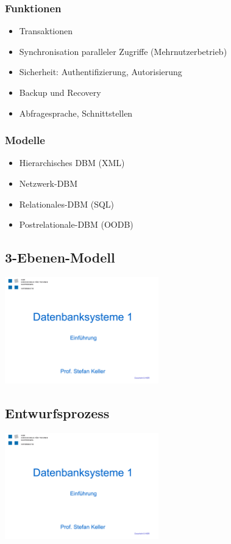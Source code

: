         \subsubsection{Funktionen}
            \begin{itemize}
              \item Transaktionen
              \item Synchronisation paralleler Zugriffe (Mehrnutzerbetrieb)
              \item Sicherheit: Authentifizierung, Autorisierung
              \item Backup und Recovery
              \item Abfragesprache, Schnittstellen
            \end{itemize}
        \subsubsection{Modelle}
            \begin{itemize}
                \item Hierarchisches DBM (XML)
                \item Netzwerk-DBM
                \item Relationales-DBM (SQL)
                \item Postrelationale-DBM (OODB)
            \end{itemize}
    \subsection{3-Ebenen-Modell}
        \includegraphics[page=22,trim=20 40 20 100,clip=true,width=0.5\textwidth]{images/einfuehrung.pdf}
    \subsection{Entwurfsprozess}
        \includegraphics[page=26,trim=20 20 20 85,clip=true,width=0.5\textwidth]{images/einfuehrung.pdf}